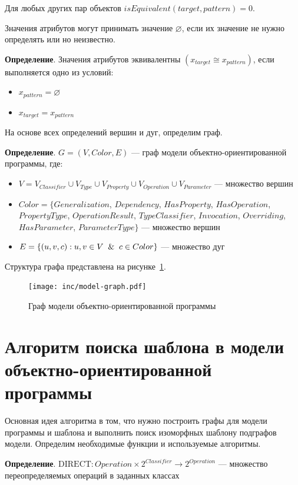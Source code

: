 Для любых других пар объектов $isEquivalent(target, pattern) = 0$.

Значения атрибутов могут принимать значение $\varnothing$,
если их значение не нужно определять или но неизвестно.

\textbf{Определение}. Значения атрибутов эквивалентны
$(x_{target} \cong x_{pattern})$, если выполняется одно из условий:
\begin{itemize}
\item $x_{pattern} = \varnothing$
\item $x_{target} = x_{pattern}$
\end{itemize}

На основе всех определений вершин и дуг, определим граф.

\textbf{Определение}. $G = (V, Color, E)$ --- граф модели объектно-ориентированной программы, где:
\begin{itemize}
\item $V = V_{Classifier} \cup V_{Type} \cup V_{Property} \cup V_{Operation} \cup V_{Parameter}$
--- множество вершин
\item $Color = \{ Generalization$, $Dependency$, $HasProperty$, $HasOperation$,
$PropertyType$, $OperationResult$, $TypeClassifier$, $Invocation$, $Overriding$,
$HasParameter$, $ParameterType \}$  --- множество вершин
\item $E = \{ (u, v, c) : u, v \in V \And c \in Color \}$ --- множество дуг
\end{itemize}

Структура графа представлена на рисунке~\ref{fig:model-graph}.

\begin{figure}
\centering
\texttt{[image: inc/model-graph.pdf]}
\caption{Граф модели объектно-ориентированной программы}
\label{fig:model-graph}
\end{figure}

\section{Алгоритм поиска шаблона в модели объектно-ориентированной программы}

Основная идея алгоритма в том, что нужно построить графы для модели программы
и шаблона и выполнить поиск изоморфных шаблону подграфов модели.
Определим необходимые функции и используемые алгоритмы.

\textbf{Определение}. $\textrm{DIRECT}: Operation \times 2^{Classifier} \to 2^{Operation}$
--- множество переопределяемых операций в заданных классах

